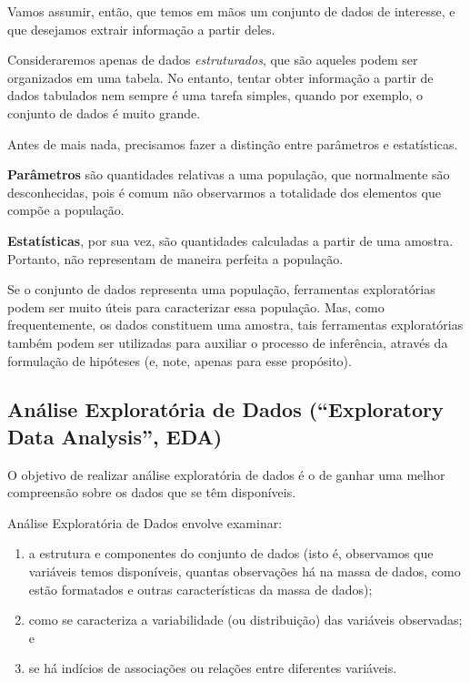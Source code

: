 \documentclass[
]{book}
\theoremstyle{definition}
\theoremstyle{definition}
\theoremstyle{definition}
\theoremstyle{remark}
\begin{document}
Vamos assumir, então, que temos em mãos um conjunto de dados de interesse, e que desejamos extrair informação a partir deles.

Consideraremos apenas de dados \emph{estruturados}, que são aqueles podem ser organizados em uma tabela. No entanto, tentar obter informação a partir de dados tabulados nem sempre é uma tarefa simples, quando por exemplo, o conjunto de dados é muito grande.

Antes de mais nada, precisamos fazer a distinção entre parâmetros e estatísticas.

\textbf{Parâmetros} são quantidades relativas a uma população, que normalmente são desconhecidas, pois é comum não observarmos a totalidade dos elementos que compõe a população.

\textbf{Estatísticas}, por sua vez, são quantidades calculadas a partir de uma amostra. Portanto, não representam de maneira perfeita a população.

Se o conjunto de dados representa uma população, ferramentas exploratórias podem ser muito úteis para caracterizar essa população. Mas, como frequentemente, os dados constituem uma amostra, tais ferramentas exploratórias também podem ser utilizadas para auxiliar o processo de inferência, através da formulação de hipóteses (e, note, apenas para esse propósito).

\hypertarget{anuxe1lise-exploratuxf3ria-de-dados-exploratory-data-analysis-eda}{%
\subsection*{Análise Exploratória de Dados (``Exploratory Data Analysis'', EDA)}\label{anuxe1lise-exploratuxf3ria-de-dados-exploratory-data-analysis-eda}}

O objetivo de realizar análise exploratória de dados é o de ganhar uma melhor compreensão sobre os dados que se têm disponíveis.

Análise Exploratória de Dados envolve examinar:

\begin{enumerate}
\def\labelenumi{(\arabic{enumi})}
\item
  a estrutura e componentes do conjunto de dados (isto é, observamos que variáveis temos disponíveis, quantas observações há na massa de dados, como estão formatados e outras características da massa de dados);
\item
  como se caracteriza a variabilidade (ou distribuição) das variáveis observadas; e
\item
  se há indícios de associações ou relações entre diferentes variáveis.
\end{enumerate}
\end{document}

